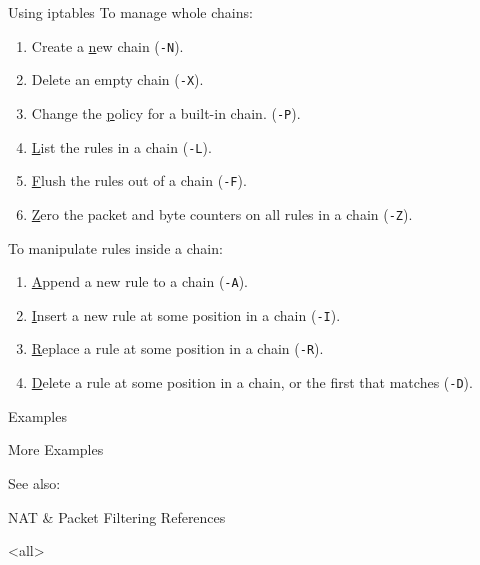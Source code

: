 \begin{frame}{Using iptables}
  To manage whole chains:
  \begin{enumerate}
  \item Create a \underline{n}ew chain (\texttt{-N}).
  \item Delete an empty chain (\texttt{-X}).
  \item Change the \underline{p}olicy for a built-in chain. (\texttt{-P}).
  \item \underline{L}ist the rules in a chain (\texttt{-L}).
  \item \underline{F}lush the rules out of a chain (\texttt{-F}).
  \item \underline{Z}ero the packet and byte counters on all rules in a chain (\texttt{-Z}).
  \end{enumerate}
  To manipulate rules inside a chain:
  \begin{enumerate}
  \item \underline{A}ppend a new rule to a chain (\texttt{-A}).
  \item \underline{I}nsert a new rule at some position in a chain (\texttt{-I}).
  \item \underline{R}eplace a rule at some position in a chain (\texttt{-R}).
  \item \underline{D}elete a rule at some position in a chain, or the first that matches
    (\texttt{-D}).
  \end{enumerate}
\end{frame}

\begin{frame}{Examples}
  \begin{center}
  \end{center}
\end{frame}

\begin{frame}{More Examples}
  \begin{center}
  \end{center}
\end{frame}

See also: 

\begin{frame}{NAT \& Packet Filtering References}
  \begin{refsection}
    \nocite{wiki:nat, rfc1631, web:nat, wiki:iptables,}
    \printbibliography[heading=none]
  \end{refsection}
\end{frame}

\mode<all>

